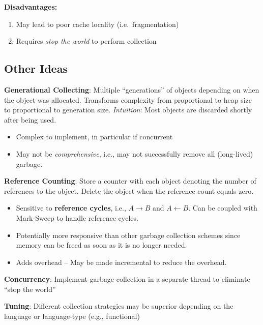 \documentclass[10pt,twocolumn]{report}
\begin{document}
\textbf{Disadvantages:}
\begin{enumerate}
  \item May lead to poor cache locality (i.e.\ fragmentation)
  \item Requires \textit{stop the world} to perform collection
\end{enumerate}

\subsection*{Other Ideas}

\textbf{Generational Collecting}: Multiple ``generations'' of objects depending on when the object was allocated. Transforms complexity from proportional to heap size to proportional to generation size. \textit{Intuition}: Most objects are discarded shortly after being used.
\begin{itemize}
  \item Complex to implement, in particular if concurrent
  \item May not be \textit{comprehensive}, i.e., may not successfully remove all (long-lived) garbage.
\end{itemize}

\textbf{Reference Counting}: Store a counter with each object denoting the number of references to the object.  Delete the object when the reference count equals zero.
\begin{itemize}
  \item Sensitive to \textbf{reference cycles}, i.e., $A \rightarrow B$ and $A \leftarrow B$.  Can be coupled with Mark-Sweep to handle reference cycles.
  \item Potentially more responsive than other garbage collection schemes since memory can be freed as soon as it is no longer needed.
  \item Adds overhead -- May be made incremental to reduce the overhead.
\end{itemize}

\textbf{Concurrency}: Implement garbage collection in a separate thread to eliminate ``stop the world''

\textbf{Tuning}: Different collection strategies may be superior depending on the language or language-type (e.g., functional)
\end{document}
